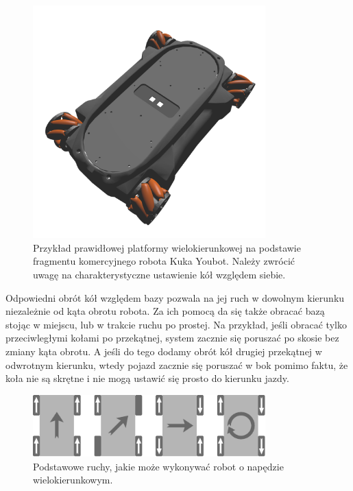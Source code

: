 \begin{figure}[H]
\centering
 \includegraphics[width=0.8\textwidth]{graphics/kuka_youbot.png}
\caption{Przykład prawidłowej platformy wielokierunkowej na podstawie fragmentu komercyjnego robota Kuka Youbot. Należy zwrócić uwagę na charakterystyczne ustawienie kół względem siebie.}
\end{figure} 

Odpowiedni obrót kół względem bazy pozwala na jej ruch w dowolnym kierunku niezależnie od kąta obrotu robota.
Za ich pomocą da się także obracać bazą stojąc w miejscu, lub w trakcie ruchu po prostej.
Na przykład, jeśli obracać tylko przeciwległymi kołami po przekątnej, system zacznie się poruszać po skosie bez zmiany kąta obrotu.
A jeśli do tego dodamy obrót kół drugiej przekątnej w odwrotnym kierunku, wtedy pojazd zacznie się poruszać w bok pomimo faktu, że koła nie są skrętne i nie mogą ustawić się prosto do kierunku jazdy.

\begin{figure}[H]
\centering
 \includegraphics[width=0.8\textwidth]{graphics/mecanum_dirs.pdf}
\caption{Podstawowe ruchy, jakie może wykonywać robot o napędzie wielokierunkowym.}
\end{figure} 

